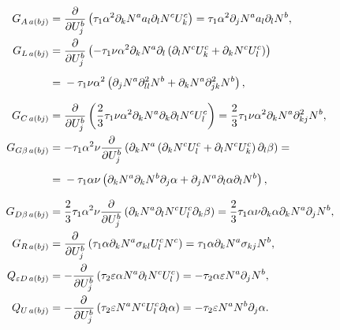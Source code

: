 \begin{align}
  G_{A\, a(bj)}            & = \frac{\partial }{\partial U_j^b} \left( \tau_1 \alpha^2 \partial_k N^a a_l \partial_l N^c U^c_k \right) = \tau_1 \alpha^2 \partial_j N^a a_l \partial_l N^b, \label{eq:GALHSStabilizationTerm}                                                              \\
  G_{L\, a(bj)}            & = \frac{\partial }{\partial U_j^b} \left( - \tau_1 \nu \alpha^2 \partial_k N^a \partial_l \left( \partial_l N^c U_k^c + \partial_k N^c U_l^c \right) \right) \notag                                                                                           \\
                           & =\vphantom{\frac{\partial }{\partial U_j^b}} - \tau_1 \nu \alpha^2 \left( \partial_j N^a \partial^2_{ll}N^b + \partial_k N^a \partial^2_{jk} N^b \right), \label{eq:GLLHSStabilizationTerm}                                                                   \\
  G_{C\, a(bj)}            & = \frac{\partial }{\partial U_j^b} \left( \frac{2}{3} \tau_1 \nu \alpha^2 \partial_k N^a \partial_k \partial_l N^c U_l^c \right) = \frac{2}{3} \tau_1 \nu \alpha^2 \partial_k N^a \partial^2_{kj} N^b, \label{eq:GCLHSStabilizationTerm}                      \\
  G_{G \beta\, a(bj)}      & = - \tau_1 \alpha^2 \nu \frac{\partial }{\partial U_j^b} \left( \partial_k N^a \left( \partial_k N^c U_l^c + \partial_l N^c U_k^c \right) \partial_l \beta \right) = \notag                                                                                   \\
                           & =\vphantom{\frac{\partial }{\partial U_j^b}} - \tau_1 \alpha \nu \left( \partial_k N^a \partial_k N^b \partial_j \alpha + \partial_j N^a \partial_l \alpha \partial_l N^b \right), \label{eq:GGBetaLHSStabilizationTerm}                                      \\
  G_{D \beta\, a(bj)}      & = \frac{2}{3} \tau_1 \alpha^2 \nu \frac{\partial }{\partial U_j^b} \left( \partial_k N^a \partial_l N^c U_l^c \partial_k \beta \right) = \frac{2}{3} \tau_1 \alpha \nu \partial_k \alpha \partial_k N^a \partial_j N^b, \label{eq:GDBetaLHSStabilizationTerm} \\
  G_{R\, a(bj)}            & = \frac{\partial }{\partial U_j^b} \left( \tau_1 \alpha \partial_k N^a \sigma_{kl} U_l^c N^c \right) = \tau_1 \alpha \partial_k N^a \sigma_{kj} N^b, \label{eq:GRLHSStabilizationTerm}                                                                               \\
  Q_{\varepsilon D\,a(bj)} & = -\frac{\partial }{\partial U_j^b} \left(\tau_2 \varepsilon \alpha N^a \partial_l N^c U_l^c\right) = -\tau_2 \alpha \varepsilon N^a \partial _j N^b, \label{eq:QepsilonDBetaLHSStabilizationTerm}                                                            \\
  Q_{U\,a(bj)}             & = -\frac{\partial }{\partial U_j^b} \left( \tau_2 \varepsilon N^a N^c U_l^c \partial_l \alpha \right) = -\tau_2 \varepsilon N^a N^b \partial_j \alpha. \label{eq:QULHSStabilizationTerm}
\end{align}

